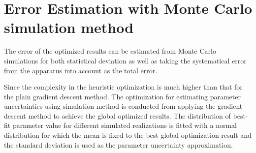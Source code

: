 \chapter{Error Estimation with Monte Carlo simulation method}
\label{appendix:montecarlo}

The error of the optimized results can be estimated 
from Monte Carlo simulations for both statistical deviation as well as 
taking the systematical error from the apparatus into account
as the total error.

Since the complexity in the heuristic optimization is much higher 
than that for the plain gradient descent method.
The optimization for estimating parameter uncertainties
using simulation method is conducted
from applying the gradient descent method to achieve the global 
optimized results. The distribution of
best-fit parameter value for different simulated realizations is
fitted with a normal distribution for which the mean is fixed
to the best global optimization result and the standard deviation
is used as the parameter uncertainty approximation.


